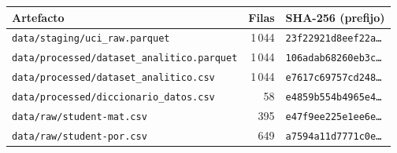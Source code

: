\begin{tabular}{lrl}
\toprule
Artefacto & Filas & SHA-256 (prefijo) \\
\midrule
\texttt{data/staging/uci\_raw.parquet} & 1\,044 & \texttt{23f22921d8eef22a…} \\
\texttt{data/processed/dataset\_analitico.parquet} & 1\,044 & \texttt{106adab68260eb3c…} \\
\texttt{data/processed/dataset\_analitico.csv} & 1\,044 & \texttt{e7617c69757cd248…} \\
\texttt{data/processed/diccionario\_datos.csv} & 58 & \texttt{e4859b554b4965e4…} \\
\texttt{data/raw/student-mat.csv} & 395 & \texttt{e47f9ee225e1ee6e…} \\
\texttt{data/raw/student-por.csv} & 649 & \texttt{a7594a11d7771c0e…} \\
\bottomrule
\end{tabular}
